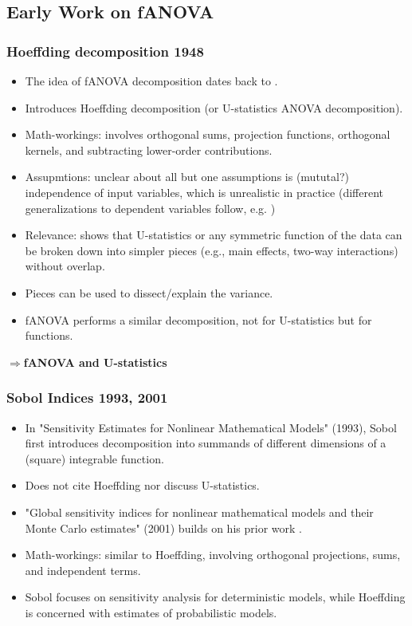 
\subsection{Early Work on fANOVA}
\subsubsection*{Hoeffding decomposition 1948}
\begin{itemize}
    \item The idea of fANOVA decomposition dates back to \cite{hoeffding_class_1948}.
    \item Introduces Hoeffding decomposition (or U-statistics ANOVA decomposition).
    \item Math-workings: involves orthogonal sums, projection functions, orthogonal kernels, and subtracting lower-order contributions.
    \item Assupmtions: unclear about all but one assumptions is (mututal?) independence of input variables, which is unrealistic in practice (different generalizations to dependent variables follow, e.g. \cite{il_idrissi_hoeffding_2025})
    \item Relevance: shows that U-statistics or any symmetric function of the data can be broken down into simpler pieces (e.g., main effects, two-way interactions) without overlap.
    \item Pieces can be used to dissect/explain the variance.
    \item fANOVA performs a similar decomposition, not for U-statistics but for functions.
\end{itemize}
$\Rightarrow$\textbf{fANOVA and U-statistics}

\subsubsection*{Sobol Indices 1993, 2001}
\begin{itemize}
    \item In "Sensitivity Estimates for Nonlinear Mathematical Models" (1993), Sobol first introduces decomposition into summands of different dimensions of a (square) integrable function.
    \item Does not cite Hoeffding nor discuss U-statistics.
    \item "Global sensitivity indices for nonlinear mathematical models and their Monte Carlo estimates" (2001) builds on his prior work \citep{sobol_global_2001}.
    \item Math-workings: similar to Hoeffding, involving orthogonal projections, sums, and independent terms.
    \item Sobol focuses on sensitivity analysis for deterministic models, while Hoeffding is concerned with estimates of probabilistic models.
\end{itemize}

